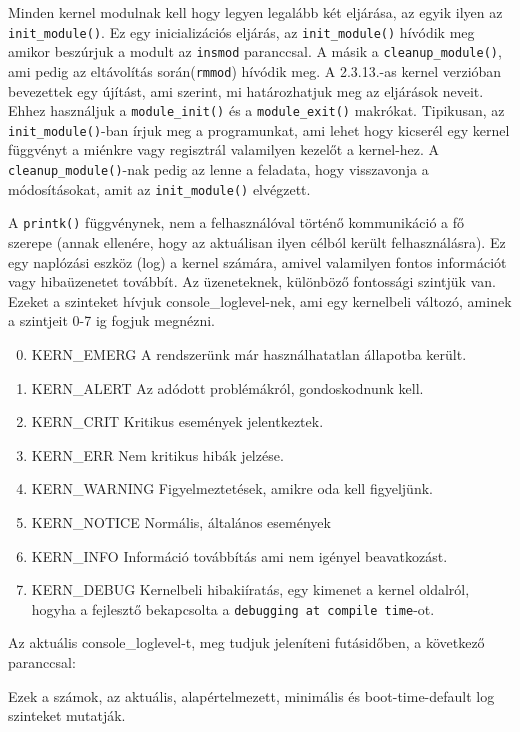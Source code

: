 Minden kernel modulnak kell hogy legyen legalább két eljárása, az egyik ilyen az \texttt{init\_module()}.
Ez egy inicializációs eljárás, az \texttt{init\_module()} hívódik meg amikor beszúrjuk a modult az \texttt{insmod} paranccsal.
A másik a \texttt{cleanup\_module()}, ami pedig az eltávolítás során(\texttt{rmmod}) hívódik meg.
A 2.3.13.-as kernel verzióban bevezettek egy újítást, ami szerint, mi határozhatjuk meg az eljárások neveit. Ehhez használjuk a \texttt{module\_init()} és a \texttt{module\_exit()} makrókat. Tipikusan, az \texttt{init\_module()}-ban írjuk meg a programunkat, ami lehet hogy kicserél egy kernel függvényt a miénkre vagy regisztrál valamilyen kezelőt a kernel-hez. A \texttt{cleanup\_module()}-nak pedig az lenne a feladata, hogy visszavonja a módosításokat, amit az \texttt{init\_module()} elvégzett.

A \texttt{printk()} függvénynek, nem a felhasználóval történő kommunikáció a fő szerepe (annak ellenére, hogy az aktuálisan ilyen célból került felhasználásra). Ez egy naplózási eszköz (log) a kernel számára, amivel valamilyen fontos információt vagy hibaüzenetet továbbít. Az üzeneteknek, különböző fontossági szintjük van. Ezeket a szinteket hívjuk console\_loglevel-nek, ami egy kernelbeli változó, aminek a szintjeit 0-7 ig fogjuk megnézni. 
\begin{enumerate}
\setcounter{enumi}{-1}
	\item KERN\_EMERG \- A rendszerünk már használhatatlan állapotba került.
	\item KERN\_ALERT \- Az adódott problémákról, gondoskodnunk kell.
	\item KERN\_CRIT \- Kritikus események jelentkeztek.
	\item KERN\_ERR \- Nem kritikus hibák jelzése.
	\item KERN\_WARNING	\- Figyelmeztetések, amikre oda kell figyeljünk.
	\item KERN\_NOTICE \- Normális, általános események
	\item KERN\_INFO \- Információ továbbítás ami nem igényel beavatkozást.
	\item KERN\_DEBUG \- Kernelbeli hibakiíratás, egy kimenet a kernel oldalról, hogyha a fejlesztő bekapcsolta a \texttt{debugging at compile time}-ot.
\end{enumerate}
Az aktuális console\_loglevel-t, meg tudjuk jeleníteni futásidőben, a következő paranccsal:
Ezek a számok, az aktuális, alapértelmezett, minimális és boot-time-default log szinteket mutatják.





